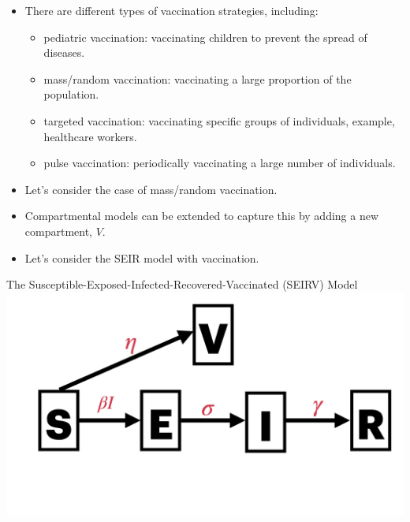 \documentclass[
  ignorenonframetext,
]{beamer}
\providecommand{\tightlist}{%
  \setlength{\itemsep}{0pt}\setlength{\parskip}{0pt}}\usepackage{longtable,booktabs,array}
\begin{document}
\begin{frame}
\begin{itemize}
\item
  There are different types of vaccination strategies, including:

  \begin{itemize}
  \tightlist
  \item
    {pediatric} vaccination: vaccinating children to prevent the spread
    of diseases.
  \item
    {mass/random} vaccination: vaccinating a large proportion of the
    population.
  \item
    {targeted} vaccination: vaccinating specific groups of individuals,
    example, healthcare workers.
  \item
    {pulse} vaccination: periodically vaccinating a large number of
    individuals.
  \end{itemize}
\end{itemize}
\end{frame}

\begin{frame}
\begin{itemize}
\item
  Let's consider the case of mass/random vaccination.
\item
  Compartmental models can be extended to capture this by adding a new
  compartment, \(V\).
\item
  Let's consider the SEIR model with vaccination.
\end{itemize}
\end{frame}

\begin{frame}
\begin{block}{The Susceptible-Exposed-Infected-Recovered-Vaccinated
(SEIRV) Model}
\label{the-susceptible-exposed-infected-recovered-vaccinated-seirv-model}
\includegraphics{images/model_diagrams/model_diagrams.010.jpeg}
\end{block}
\end{frame}
\end{document}
